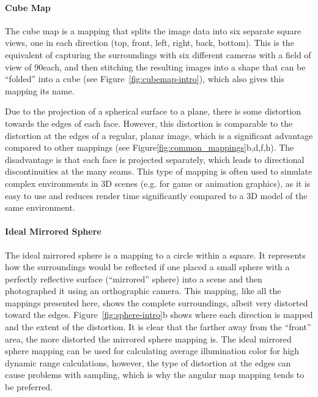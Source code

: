 \paragraph{Cube Map}
The cube map is a mapping that splits the image data into six separate square views, one in each direction (top, front, left, right, back, bottom). This is the equivalent of capturing the surroundings with six different cameras with a field of view of 90\degree each, and then stitching the resulting images into a shape that can be ``folded'' into a cube (see Figure~\ref{fig:cubemap-intro}), which also gives this mapping its name.

Due to the projection of a spherical surface to a plane, there is some distortion towards the edges of each face. However, this distortion is comparable to the distortion at the edges of a regular, planar image, which is a significant advantage compared to other mappings (see Figure\ref{fig:common_mappings}b,d,f,h\footnotemark). The disadvantage is that each face is projected separately, which leads to directional discontinuities at the many seams. This type of mapping is often used to simulate complex environments in 3D scenes (e.g. for game or animation graphics), as it is easy to use and reduces render time significantly compared to a 3D model of the same environment.

\cite[p. 540]{hdrbook}

\paragraph{Ideal Mirrored Sphere}
The ideal mirrored sphere is a mapping to a circle within a square. It represents how the surroundings would be reflected if one placed a small sphere with a perfectly reflective surface (``mirrored'' sphere) into a scene and then photographed it using an orthographic camera. This mapping, like all the mappings presented here, shows the complete surroundings, albeit very distorted toward the edges. Figure~\ref{fig:sphere-intro}b shows where each direction is mapped and the extent of the distortion. It is clear that the farther away from the ``front'' area, the more distorted the mirrored sphere mapping is. The ideal mirrored sphere mapping can be used for calculating average illumination color for high dynamic range calculations, however, the type of distortion at the edges can cause problems with sampling, which is why the angular map mapping tends to be preferred.
\cite[p. 535]{hdrbook}

